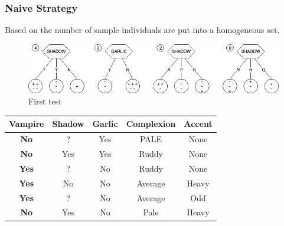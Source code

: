 \documentclass[12pt]{book}
\begin{document}
\subsubsection{Naive Strategy}
Based on the number of sample individuals are put into a homogeneous set.
\begin{figure}[ht]
	\centering
	\includegraphics[scale=0.7]{Figure/Figure11_1.png}
	\caption{First test}
\end{figure}
\newpage
\begin{table}[ht]
	\centering
	\begin{tabular}{|c|c|c|c|c|}
		\hline
		\rowcolor[HTML]{C0C0C0} 
		{\color[HTML]{000000} \textbf{Vampire}} & {\color[HTML]{000000} \textbf{Shadow}} & {\color[HTML]{000000} \textbf{Garlic}} & {\color[HTML]{000000} \textbf{Complexion}} & {\color[HTML]{000000} \textbf{Accent}} \\ \hline
		{\color[HTML]{000000} \textbf{No}}      & {\color[HTML]{000000} ?}               & {\color[HTML]{000000} Yes}             & {\color[HTML]{000000} PALE}                & {\color[HTML]{000000} None}            \\ \hline
		\rowcolor[HTML]{000000} 
		{\color[HTML]{000000} \textbf{No}}      & {\color[HTML]{000000} Yes}             & {\color[HTML]{000000} Yes}             & {\color[HTML]{000000} Ruddy}               & {\color[HTML]{000000} None}            \\ \hline
		{\color[HTML]{000000} \textbf{Yes}}     & {\color[HTML]{000000} ?}               & {\color[HTML]{000000} No}              & {\color[HTML]{000000} Ruddy}               & {\color[HTML]{000000} None}            \\ \hline
		\rowcolor[HTML]{000000} 
		{\color[HTML]{000000} \textbf{Yes}}     & {\color[HTML]{000000} No}              & {\color[HTML]{000000} No}              & {\color[HTML]{000000} Average}             & {\color[HTML]{000000} Heavy}           \\ \hline
		{\color[HTML]{000000} \textbf{Yes}}     & {\color[HTML]{000000} ?}               & {\color[HTML]{000000} No}              & {\color[HTML]{000000} Average}             & {\color[HTML]{000000} Odd}             \\ \hline
		\rowcolor[HTML]{000000} 
		{\color[HTML]{000000} \textbf{No}}      & {\color[HTML]{000000} Yes}             & {\color[HTML]{000000} No}              & {\color[HTML]{000000} Pale}                & {\color[HTML]{000000} Heavy}           \\ \hline

\end{tabular}
\end{table}
\end{document}
